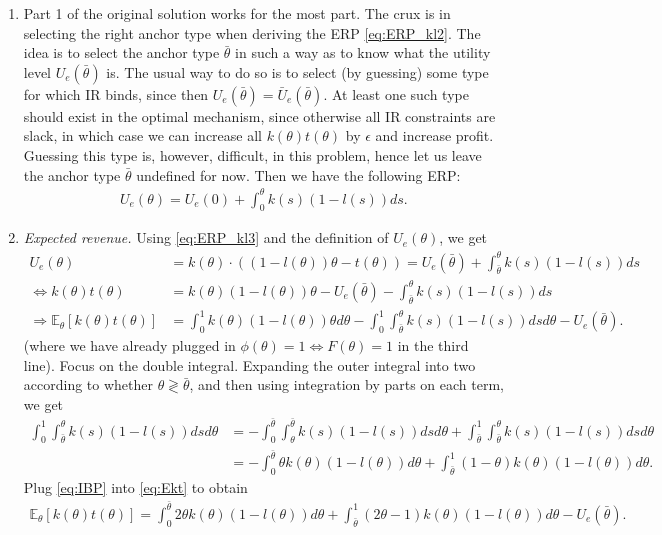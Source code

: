 \documentclass[a4paper]{article}
\begin{document}
	\begin{enumerate}
		\item Part 1 of the original solution works for the most part. The crux is in selecting the right anchor type when deriving the ERP \eqref{eq:ERP_kl2}. The idea is to select the anchor type $\bar{\theta}$ in such a way as to know what the utility level $U_e(\bar{\theta})$ is. The usual way to do so is to select (by guessing) some type for which IR binds, since then $U_e(\bar{\theta}) = \bar{U}_e(\bar{\theta})$. At least one such type should exist in the optimal mechanism, since otherwise all IR constraints are slack, in which case we can increase all $k(\theta)t(\theta)$ by $\epsilon$ and increase profit. Guessing this type is, however, difficult, in this problem, hence let us leave the anchor type $\bar{\theta}$ undefined for now. Then we have the following ERP:
		\begin{align}
			U_e(\theta) = U_e(0) + \int_0^\theta k(s) (1-l(s)) ds.
			\label{eq:ERP_kl3}
		\end{align}
		
		\item \emph{Expected revenue.} Using \eqref{eq:ERP_kl3} and the definition of $U_e(\theta)$, we get
		\begin{align}
			U_e(\theta) &= k(\theta) \cdot \left( (1-l(\theta)) \theta - t(\theta) \right) = U_e(\bar{\theta}) + \int_{\bar{\theta}}^\theta k(s) (1-l(s)) ds
			\nonumber
			\\
			\Leftrightarrow
			k(\theta) t(\theta) &= k(\theta) (1-l(\theta)) \theta - U_e(\bar{\theta}) - \int_{\bar{\theta}}^\theta k(s) (1-l(s)) ds
			\label{eq:kt}
			\\
			\Rightarrow
			\mathbb{E}_\theta [k(\theta) t(\theta)] &= \int_0^1 k(\theta) (1-l(\theta)) \theta d\theta - \int_0^1 \int_{\bar{\theta}}^\theta k(s) (1-l(s)) ds d\theta - U_e(\bar{\theta}).
			\label{eq:Ekt}
		\end{align}
		(where we have already plugged in $\phi(\theta)=1\Leftrightarrow F(\theta)=1$ in the third line).
		Focus on the double integral. Expanding the outer integral into two according to whether $\theta \gtrless \bar{\theta}$, and then using integration by parts on each term, we get
		\begin{align}
			\int_0^1 \int_{\bar{\theta}}^\theta k(s) (1-l(s)) ds d\theta
			&= -\int_0^{\bar{\theta}} \int^{\bar{\theta}}_\theta k(s) (1-l(s)) ds d\theta + \int_{\bar{\theta}}^1 \int_{\bar{\theta}}^\theta k(s) (1-l(s)) ds d\theta
			\nonumber
			\\
			&= -\int_0^{\bar{\theta}} \theta k(\theta) (1-l(\theta)) d\theta + \int_{\bar{\theta}}^1 (1-\theta) k(\theta) (1-l(\theta)) d\theta.
			\label{eq:IBP}
		\end{align}
		Plug \eqref{eq:IBP} into \eqref{eq:Ekt} to obtain
		\begin{align*}
			\mathbb{E}_\theta [k(\theta) t(\theta)] = \int_0^{\bar{\theta}} 2\theta k(\theta) (1-l(\theta)) d\theta + \int_{\bar{\theta}}^1 (2\theta-1) k(\theta) (1-l(\theta)) d\theta - U_e(\bar{\theta}).
		\end{align*}
	

\end{enumerate}
\end{document}
